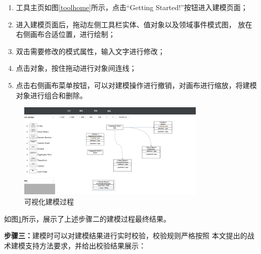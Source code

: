 \begin{enumerate}
    \item 工具主页如图\ref{toolhome}所示，点击“Getting Started!”按钮进入建模页面；
    \item 进入建模页面后，拖动左侧工具栏实体、值对象以及领域事件模式图，
    放在右侧画布合适位置，进行绘制；
    \item 双击需要修改的模式属性，输入文字进行修改；
    \item 点击对象，按住拖动进行对象间连线；
    \item 点击右侧画布菜单按钮，可以对建模操作进行撤销，对画布进行缩放，将建模对象进行组合和删除。
\end{enumerate}
\begin{figure}[!htbp] %
    \centering %
    \includegraphics[width=0.8\textwidth]{FIGs/chapter5/drawingmodel.png} %
    \caption{可视化建模过程} %
    \label{drawingmodel} %
\end{figure}%


如图\ref{drawingmodel}所示，展示了上述步骤二的建模过程最终结果。


\textbf{步骤三：}建模时可以对建模结果进行实时校验，校验规则严格按照
本文提出的战术建模支持方法要求，并给出校验结果展示：


